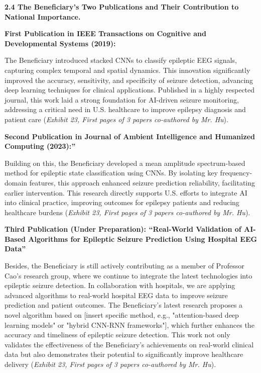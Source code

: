 \documentclass{article}
\begin{document}
{\bf 2.4 The Beneficiary’s Two Publications and Their Contribution to National Importance. }

{\bf First Publication in IEEE Transactions on Cognitive and Developmental Systems (2019):}

The Beneficiary introduced stacked CNNs to classify epileptic EEG signals, capturing complex temporal and spatial dynamics. This innovation significantly improved the accuracy, sensitivity, and specificity of seizure detection, advancing deep learning techniques for clinical applications. Published in a highly respected journal, this work laid a strong foundation for AI-driven seizure monitoring, addressing a critical need in U.S. healthcare to improve epilepsy diagnosis and patient care ({\it Exhibit 23, First pages of 3 papers co-authored by Mr. Hu}).

{\bf Second Publication in Journal of Ambient Intelligence and Humanized Computing (2023):”}

Building on this, the Beneficiary developed a mean amplitude spectrum-based method for epileptic state classification using CNNs. By isolating key frequency-domain features, this approach enhanced seizure prediction reliability, facilitating earlier intervention. This research directly supports U.S. efforts to integrate AI into clinical practice, improving outcomes for epilepsy patients and reducing healthcare burdens ({\it Exhibit 23, First pages of 3 papers co-authored by Mr. Hu}). 

{\bf Third Publication (Under Preparation): “Real-World Validation of AI-Based Algorithms for Epileptic Seizure Prediction Using Hospital EEG Data”}

Besides, the Beneficiary is still actively contributing as a member of Professor Cao's research group, where we continue to integrate the latest technologies into epileptic seizure detection. In collaboration with hospitals, we are applying advanced algorithms to real-world hospital EEG data to improve seizure prediction and patient outcomes. The Beneficiary's latest research proposes a novel algorithm based on [insert specific method, e.g., "attention-based deep learning models" or "hybrid CNN-RNN frameworks"], which further enhances the accuracy and timeliness of epileptic seizure detection. This work not only validates the effectiveness of the Beneficiary’s achievements on real-world clinical data but also demonstrates their potential to significantly improve healthcare delivery ({\it Exhibit 23, First pages of 3 papers co-authored by Mr. Hu}).
\end{document}
